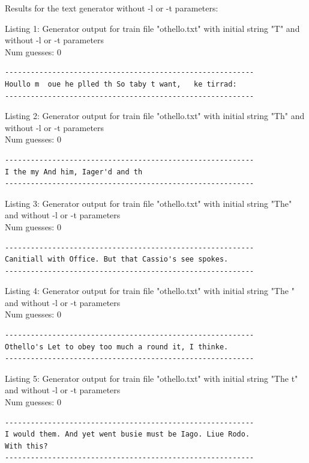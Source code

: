 \documentclass{article}
\begin{document}
Results for the text generator without -l or -t parameters:

\hfill

Listing 1: Generator output for train file "othello.txt" with initial string "T" and without -l or -t parameters
\\Num guesses: 0

\begin{lstlisting}
----------------------------------------------------------
Houllo m  oue he plled th So taby t want,   ke tirrad:
----------------------------------------------------------
\end{lstlisting}

Listing 2: Generator output for train file "othello.txt" with initial string "Th" and without -l or -t parameters
\\Num guesses: 0

\begin{lstlisting}
----------------------------------------------------------
I the my And him, Iager'd and th
----------------------------------------------------------
\end{lstlisting}

Listing 3: Generator output for train file "othello.txt" with initial string "The" and without -l or -t parameters
\\Num guesses: 0

\begin{lstlisting}
----------------------------------------------------------
Canitiall with Office. But that Cassio's see spokes.
----------------------------------------------------------
\end{lstlisting}

Listing 4: Generator output for train file "othello.txt" with initial string "The " and without -l or -t parameters
\\Num guesses: 0

\begin{lstlisting}
----------------------------------------------------------
Othello's Let to obey too much a round it, I thinke.
----------------------------------------------------------
\end{lstlisting}

Listing 5: Generator output for train file "othello.txt" with initial string "The t" and without -l or -t parameters
\\Num guesses: 0

\begin{lstlisting}
----------------------------------------------------------
I would them. And yet went busie must be Iago. Liue Rodo. 
With this?
----------------------------------------------------------
\end{lstlisting}
\end{document}
